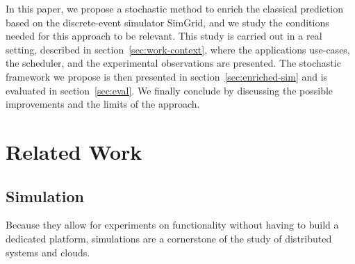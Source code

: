 \documentclass[10pt,conference,compsocconf]{IEEEtran}
\begin{document}
In this paper, we propose a stochastic method to enrich the classical prediction
based  on the  discrete-event simulator  SimGrid,  and we  study the  conditions
needed for  this approach to be  relevant. This study  is carried out in  a real
setting,  described in  section~\ref{sec:work-context},  where the  applications
use-cases, the scheduler, and the  experimental observations are presented.  The
stochastic     framework     we     propose     is     then     presented     in
section~\ref{sec:enriched-sim}  and is  evaluated in  section~\ref{sec:eval}. We
finally conclude by  discussing the possible improvements and the  limits of the
approach.


\section{Related Work}

\subsection{Simulation}

Because they allow for experiments on functionality without having to build a
dedicated platform, simulations are a cornerstone of the study of distributed
systems and clouds.  
\end{document}
